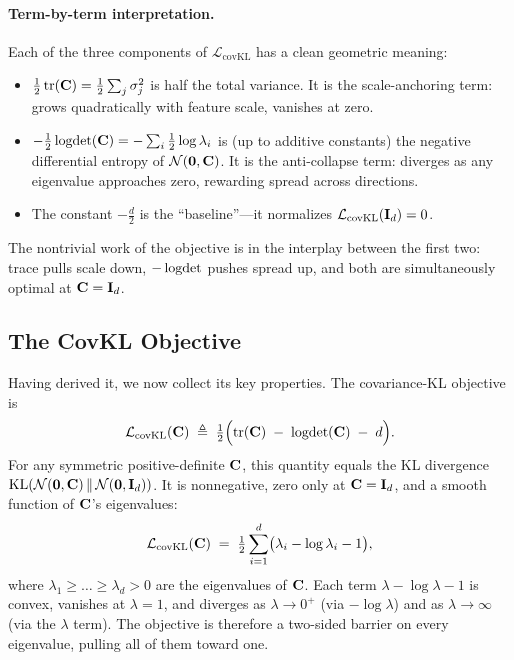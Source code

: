 \paragraph{Term-by-term interpretation.}
Each of the three components of $\mathcal{L}_\text{covKL}$ has a clean geometric meaning:
\begin{itemize}
    \item $\tfrac{1}{2}\operatorname{tr}(\mathbf{C}) = \tfrac{1}{2}\sum_j \sigma_j^2$ is half the total variance. It is the scale-anchoring term: grows quadratically with feature scale, vanishes at zero.
    \item $-\tfrac{1}{2}\operatorname{logdet}(\mathbf{C}) = -\sum_i \tfrac{1}{2}\log\lambda_i$ is (up to additive constants) the negative differential entropy of $\mathcal{N}(\mathbf{0}, \mathbf{C})$. It is the anti-collapse term: diverges as any eigenvalue approaches zero, rewarding spread across directions.
    \item The constant $-\tfrac{d}{2}$ is the ``baseline''---it normalizes $\mathcal{L}_\text{covKL}(\mathbf{I}_d) = 0$.
\end{itemize}
The nontrivial work of the objective is in the interplay between the first two: trace pulls scale down, $-\operatorname{logdet}$ pushes spread up, and both are simultaneously optimal at $\mathbf{C} = \mathbf{I}_d$.

\subsection{The CovKL Objective}

Having derived it, we now collect its key properties. The covariance-KL objective is
\begin{equation}
\label{eq:covkl_def}
    \mathcal{L}_\text{covKL}(\mathbf{C}) \;\triangleq\; \tfrac{1}{2}\Bigl(\operatorname{tr}(\mathbf{C}) \;-\; \operatorname{logdet}(\mathbf{C}) \;-\; d\Bigr).
\end{equation}
For any symmetric positive-definite $\mathbf{C}$, this quantity equals the KL divergence $\mathrm{KL}(\mathcal{N}(\mathbf{0}, \mathbf{C}) \,\|\, \mathcal{N}(\mathbf{0}, \mathbf{I}_d))$. It is nonnegative, zero only at $\mathbf{C} = \mathbf{I}_d$, and a smooth function of $\mathbf{C}$'s eigenvalues:
\begin{equation}
\label{eq:covkl_eigendecomp}
    \mathcal{L}_\text{covKL}(\mathbf{C}) \;=\; \tfrac{1}{2}\sum_{i=1}^{d}\bigl(\lambda_i - \log\lambda_i - 1\bigr),
\end{equation}
where $\lambda_1 \ge \dots \ge \lambda_d > 0$ are the eigenvalues of $\mathbf{C}$. Each term $\lambda - \log\lambda - 1$ is convex, vanishes at $\lambda = 1$, and diverges as $\lambda \to 0^+$ (via $-\log\lambda$) and as $\lambda \to \infty$ (via the $\lambda$ term). The objective is therefore a two-sided barrier on every eigenvalue, pulling all of them toward one.

